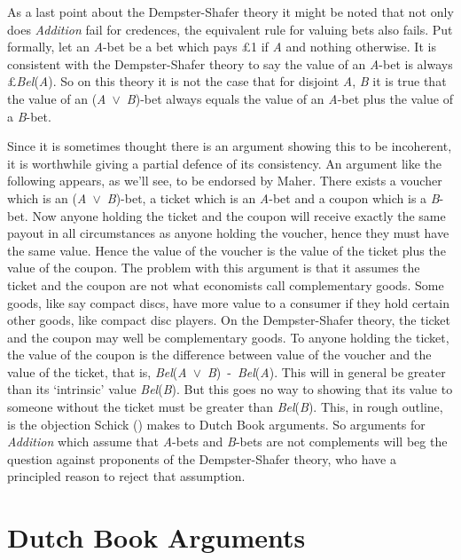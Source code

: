 \documentclass[
  10pt,
  letterpaper,
  DIV=11,
  numbers=noendperiod,
  twoside]{scrartcl}
\begin{document}
As a last point about the Dempster-Shafer theory it might be noted that
not only does \emph{Addition} fail for credences, the equivalent rule
for valuing bets also fails. Put formally, let an \emph{A}-bet be a bet
which pays £1 if \emph{A} and nothing otherwise. It is consistent with
the Dempster-Shafer theory to say the value of an \emph{A}-bet is always
£\emph{Bel}(\emph{A}). So on this theory it is not the case that for
disjoint \emph{A}, \emph{B} it is true that the value of an
(\emph{A}~\({\vee}\)~\emph{B})-bet always equals the value of an
\emph{A}-bet plus the value of a \emph{B}-bet.

Since it is sometimes thought there is an argument showing this to be
incoherent, it is worthwhile giving a partial defence of its
consistency. An argument like the following appears, as we'll see, to be
endorsed by Maher. There exists a voucher which is an
(\emph{A}~\({\vee}\)~\emph{B})-bet, a ticket which is an \emph{A}-bet
and a coupon which is a \emph{B}-bet. Now anyone holding the ticket and
the coupon will receive exactly the same payout in all circumstances as
anyone holding the voucher, hence they must have the same value. Hence
the value of the voucher is the value of the ticket plus the value of
the coupon. The problem with this argument is that it assumes the ticket
and the coupon are not what economists call complementary goods. Some
goods, like say compact discs, have more value to a consumer if they
hold certain other goods, like compact disc players. On the
Dempster-Shafer theory, the ticket and the coupon may well be
complementary goods. To anyone holding the ticket, the value of the
coupon is the difference between value of the voucher and the value of
the ticket, that is,
\emph{Bel}(\emph{A}~\({\vee}\)~\emph{B})~-~\emph{Bel}(\emph{A}). This
will in general be greater than its `intrinsic' value
\emph{Bel}(\emph{B}). But this goes no way to showing that its value to
someone without the ticket must be greater than \emph{Bel}(\emph{B}).
This, in rough outline, is the objection Schick
() makes to Dutch Book arguments. So
arguments for \emph{Addition} which assume that \emph{A}-bets and
\emph{B}-bets are not complements will beg the question against
proponents of the Dempster-Shafer theory, who have a principled reason
to reject that assumption.

\section{Dutch Book Arguments}\label{dutch-book-arguments}
\end{document}
